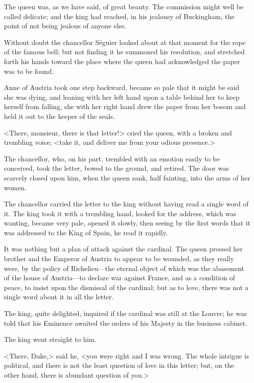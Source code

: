 The queen was, as we have said, of great beauty. The commission might well be called delicate; and the king had reached, in his jealousy of Buckingham, the point of not being jealous of anyone else. 

Without doubt the chancellor Séguier looked about at that moment for the rope of the famous bell; but not finding it he summoned his resolution, and stretched forth his hands toward the place where the queen had acknowledged the paper was to be found. 

Anne of Austria took one step backward, became so pale that it might be said she was dying, and leaning with her left hand upon a table behind her to keep herself from falling, she with her right hand drew the paper from her bosom and held it out to the keeper of the seals. 

<There, monsieur, there is that letter!> cried the queen, with a broken and trembling voice; <take it, and deliver me from your odious presence.> 

The chancellor, who, on his part, trembled with an emotion easily to be conceived, took the letter, bowed to the ground, and retired. The door was scarcely closed upon him, when the queen sank, half fainting, into the arms of her women. 

The chancellor carried the letter to the king without having read a single word of it. The king took it with a trembling hand, looked for the address, which was wanting, became very pale, opened it slowly, then seeing by the first words that it was addressed to the King of Spain, he read it rapidly. 

It was nothing but a plan of attack against the cardinal. The queen pressed her brother and the Emperor of Austria to appear to be wounded, as they really were, by the policy of Richelieu---the eternal object of which was the abasement of the house of Austria---to declare war against France, and as a condition of peace, to insist upon the dismissal of the cardinal; but as to love, there was not a single word about it in all the letter. 

The king, quite delighted, inquired if the cardinal was still at the Louvre; he was told that his Eminence awaited the orders of his Majesty in the business cabinet. 

The king went straight to him. 

<There, Duke,> said he, <you were right and I was wrong. The whole intrigue is political, and there is not the least question of love in this letter; but, on the other hand, there is abundant question of you.> 

